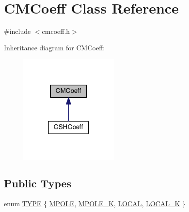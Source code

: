 \hypertarget{classCMCoeff}{\section{C\-M\-Coeff Class Reference}
\label{classCMCoeff}
}


{\ttfamily \#include $<$cmcoeff.\-h$>$}



Inheritance diagram for C\-M\-Coeff\-:
\nopagebreak
\begin{figure}[H]
\begin{center}
\leavevmode
\includegraphics[width=140pt]{classCMCoeff__inherit__graph}
\end{center}
\end{figure}
\subsection*{Public Types}
\begin{DoxyCompactItemize}
\item 
enum \hyperlink{classCMCoeff_a0b490eeb5ba86bc1a95ea1c3b2946478}{T\-Y\-P\-E} \{ \hyperlink{classCMCoeff_a0b490eeb5ba86bc1a95ea1c3b2946478a44c2e68e32e879f210aab9493a0fb48d}{M\-P\-O\-L\-E}, 
\hyperlink{classCMCoeff_a0b490eeb5ba86bc1a95ea1c3b2946478a7620a298f37501509e3a5fec264f0c4f}{M\-P\-O\-L\-E\-\_\-\-K}, 
\hyperlink{classCMCoeff_a0b490eeb5ba86bc1a95ea1c3b2946478a3a2cae46474f6e8cd2151bb47b11002c}{L\-O\-C\-A\-L}, 
\hyperlink{classCMCoeff_a0b490eeb5ba86bc1a95ea1c3b2946478a518645c07b91ad17f9af6fa00ce5042a}{L\-O\-C\-A\-L\-\_\-\-K}
 \}
\end{DoxyCompactItemize}
